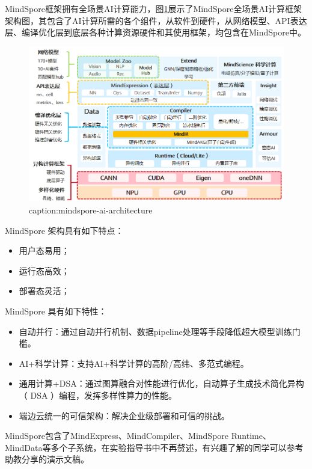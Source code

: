 MindSpore框架拥有全场景AI计算能力，图\ref{fig:mindspore-ai-architecture}展示了MindSpore全场景AI计算框架架构图，其包含了AI计算所需的各个组件，从软件到硬件，从网络模型、API表达层、编译优化层到底层各种计算资源硬件和其使用框架，均包含在MindSpore中。

\begin{figure}[htbp]
	\centering
	\includegraphics[width=1\textwidth]{figures/mindspore-ai-architecture.png}
	\caption{caption:mindspore-ai-architecture}
	\label{fig:mindspore-ai-architecture}
\end{figure}


MindSpore 架构具有如下特点：
\begin{itemize}
    \item 用户态易用；
    \item 运行态高效；
    \item 部署态灵活；
\end{itemize}

MindSpore 具有如下特性：
\begin{itemize}
    \item 自动并行：通过自动并行机制、数据pipeline处理等手段降低超大模型训练门槛。
    \item AI+科学计算：支持AI+科学计算的高阶/高纬、多范式编程。
    \item 通用计算+DSA：通过图算融合对性能进行优化，自动算子生成技术简化异构（ DSA ）编程，发挥多样性算力的性能。
    \item 端边云统一的可信架构：解决企业级部署和可信的挑战。
\end{itemize}


MindSpore包含了MindExpress、MindCompiler、MindSpore Runtime、MindData等多个子系统，在实验指导书中不再赘述，有兴趣了解的同学可以参考助教分享的演示文稿。


